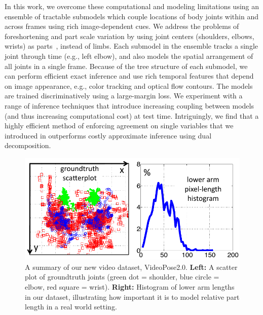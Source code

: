In this work, we overcome these computational and modeling limitations
using an ensemble of tractable submodels which couple
locations of body joints within and across frames using rich
image-dependent cues.  We address the problems of foreshortening and
part scale variation by using joint centers (shoulders, elbows,
wrists) as parts~\citep{lee06,urtasun08,rogez08}, instead of
limbs. Each submodel in the ensemble tracks a
single joint through time (e.g., left elbow), and also models the
spatial arrangement of all joints in a single frame.  Because of the
tree structure of each submodel, we can perform efficient exact
inference and use rich temporal features that depend on image
appearance, e.g., color tracking and optical flow contours. The models
are trained discriminatively using a large-margin loss. We
experiment with a range of inference techniques that introduce
increasing coupling between models (and thus increasing computational
cost) at test time. Intriguingly, we find that a highly efficient method of
enforcing agreement on single variables that we introduced in
\citet{weisssapp10} outperforms costly approximate inference using dual
decomposition.

\begin{figure}[tb!]
\centering
\includegraphics[width=0.9\linewidth]{figs/videopose-dataset-stats.pdf}
\caption[VideoPose2.0 statistics]{\label{fig:dataset} A summary of our new 
video dataset, VideoPose2.0.  \textbf{Left:} A scatter plot of groundtruth 
joints (green dot = shoulder, blue circle = elbow, red square = wrist).  
\textbf{Right:} Histogram of lower arm lengths in our dataset, illustrating how 
important it is to model relative part length in a real world setting.  }
\label{fig:videopose-dataset-stats}
\end{figure}


